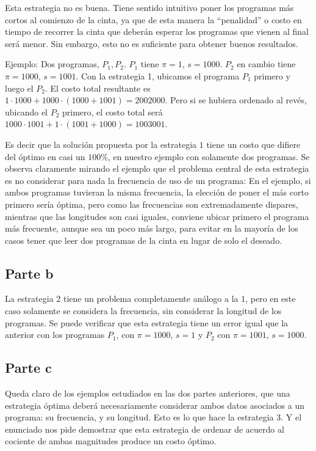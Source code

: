 \documentclass{article}
\begin{document}
Esta estrategia no es buena. Tiene sentido intuitivo poner los programas más cortos al comienzo de la cinta,
ya que de esta manera la ``penalidad'' o costo en tiempo de recorrer la cinta que deberán esperar los programas que vienen al final será menor. Sin embargo,
esto no es suficiente para obtener buenos resultados.

Ejemplo: Dos programas, $P_1,P_2$. $P_1$ tiene $\pi = 1$, $s = 1000$. $P_2$ en cambio tiene $\pi = 1000$, $s = 1001$. Con la estrategia 1, ubicamos el
programa $P_1$ primero y luego el $P_2$. El costo total resultante es $1 \cdot 1000 + 1000 \cdot (1000 + 1001) = 2002000$. Pero si se hubiera ordenado al revés,
ubicando el $P_2$ primero, el costo total será $1000 \cdot 1001 + 1 \cdot (1001 + 1000) = 1003001$.

Es decir que la solución propuesta por la estrategia $1$ tiene un costo que difiere del óptimo en casi un $100\%$, en nuestro ejemplo con solamente dos programas.
Se observa claramente mirando el ejemplo que el problema central de esta estrategia es no considerar para nada la frecuencia de uso de un programa: En el ejemplo,
si ambos programas tuvieran la misma frecuencia, la elección de poner el más corto primero sería óptima, pero como las frecuencias son extremadamente dispares,
mientras que las longitudes son casi iguales, conviene ubicar primero el programa más frecuente, aunque sea un poco más largo, para evitar en la mayoría de los
casos tener que leer dos programas de la cinta en lugar de solo el deseado.

\subsection{Parte b}

La estrategia 2 tiene un problema completamente análogo a la 1, pero en este caso solamente se considera la frecuencia, sin considerar la longitud de los programas.
Se puede verificar que esta estrategia tiene un error igual que la anterior con los programas $P_1$, con $\pi = 1000$, $s = 1$ y $P_2$ con $\pi = 1001$, $s = 1000$.

\subsection{Parte c}

Queda claro de los ejemplos estudiados en las dos partes anteriores, que una estrategia óptima deberá necesariamente considerar ambos datos asociados a un programa: su frecuencia, y su longitud.
Esto es lo que hace la estrategia 3. Y el enunciado nos pide demostrar que esta estrategia de ordenar de acuerdo al cociente de ambas magnitudes produce un costo óptimo.
\end{document}
